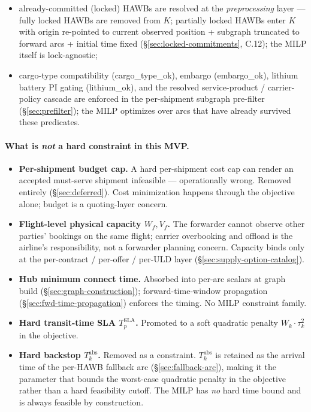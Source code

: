 \documentclass[11pt,a4paper]{article}
\theoremstyle{definition}
\begin{document}
\begin{itemize}[noitemsep]
        \emph{quadratically} with combined weight $W_k = w_{\text{sp}(k)} \cdot
        \mu_k$, where $\mu_k = \text{value}_k / V^{\text{ref}}$ is the
        shipment-value coefficient (C.10, PWL-linearized in
        \S\ref{sec:lin-tardiness});
  \item already-committed (locked) HAWBs are resolved at the \emph{preprocessing}
        layer --- fully locked HAWBs are removed from $K$; partially locked
        HAWBs enter $K$ with origin re-pointed to current observed position +
        subgraph truncated to forward arcs + initial time fixed
        (\S\ref{sec:locked-commitments}, C.12); the MILP itself is
        lock-agnostic;
  \item cargo-type compatibility (cargo\_type\_ok), embargo (embargo\_ok),
        lithium battery PI gating (lithium\_ok), and the resolved
        service-product / carrier-policy cascade are enforced in the
        per-shipment subgraph pre-filter
        (\S\ref{sec:prefilter}); the MILP optimizes over arcs that have already
        survived these predicates.
\end{itemize}

\paragraph{What is \emph{not} a hard constraint in this MVP.}
\begin{itemize}[noitemsep]
  \item \textbf{Per-shipment budget cap.} A hard per-shipment cost cap can render
        an accepted must-serve shipment infeasible --- operationally wrong.
        Removed entirely (\S\ref{sec:deferred}). Cost minimization happens
        through the objective alone; budget is a quoting-layer concern.
  \item \textbf{Flight-level physical capacity $W_f, V_f$.} The forwarder cannot
        observe other parties' bookings on the same flight; carrier overbooking
        and offload is the airline's responsibility, not a forwarder planning
        concern. Capacity binds only at the per-contract / per-offer / per-ULD
        layer (\S\ref{sec:supply-option-catalog}).
  \item \textbf{Hub minimum connect time.} Absorbed into per-arc scalars at graph
        build (\S\ref{sec:graph-construction}); forward-time-window propagation
        (\S\ref{sec:fwd-time-propagation}) enforces the timing. No MILP
        constraint family.
  \item \textbf{Hard transit-time SLA $T_p^{\text{SLA}}$.} Promoted to a soft
        quadratic penalty $W_k \cdot \tau_k^2$ in the objective.
  \item \textbf{Hard backstop $T_k^{\text{abs}}$.} Removed as a constraint.
        $T_k^{\text{abs}}$ is retained as the arrival time of the per-HAWB
        fallback arc (\S\ref{sec:fallback-arc}), making it the parameter that
        bounds the worst-case quadratic penalty in the objective rather than a
        hard feasibility cutoff. The MILP has \emph{no} hard time bound and is
        always feasible by construction.
\end{itemize}
\end{document}

